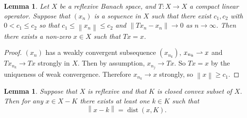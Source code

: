 \documentclass[12pt,a4paper]{report}
\numberwithin{equation}{section}
\theoremstyle{mystyle}
\newtheorem{lemma}[definition]{Lemma}
\newcommand{\norm}[1]{\left\lVert #1 \right\rVert}
\newcommand{\dist}{\operatorname{dist}}
\begin{document}
	\begin{lemma}
		Let $X$ be a reflexive Banach space, and $T:X\to X$ a compact linear operator. Suppose that $(x_n)$ is a sequence in $X$ such that there exist $c_1,c_2$ with $0<c_1\leq c_2$ so that $c_1\leq \norm{x_n}\leq c_2$ and $\norm{Tx_n-x_n}\to 0$ as $n\to\infty$. Then there exists a non-zero $x\in X$ such that $Tx=x$.
	\end{lemma}
	\begin{proof}
		$(x_n)$ has a weakly convergent subsequence $(x_{n_k})$, $x_{n_k}\rightharpoonup x$ and $Tx_{n_k}\to Tx$ strongly in $X$. Then by assumption, $x_{n_j}\to Tx$. So $Tx=x$ by the uniqueness of weak convergence. Therefore $x_{n_k}\to x$ strongly, so $\norm{x}\geq c_1$.
	\end{proof}

	\begin{lemma}
		Suppose that $X$ is reflexive and that $K$ is closed convex subset of $X$. Then for any $x\in X-K$ there exists at least one $k\in K$ such that
		$$
		\norm{x-k}=\dist(x,K).
		$$
	\end{lemma}







	\appendix
	
	 
\end{document}
